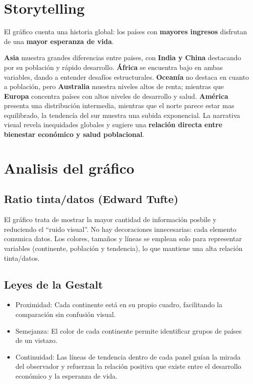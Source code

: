 \documentclass{../../miPlantilla}
\begin{document}
\maketitle

\section{Storytelling}
El gráfico cuenta una historia global: los países con \textbf{mayores ingresos} disfrutan de una \textbf{mayor esperanza de vida}.


\textbf{Asia} muestra grandes diferencias entre paises, con \textbf{India y China} destacando por su población y rápido desarrollo.
\textbf{África} se encuentra bajo en ambas variables, dando a entender desafíos estructurales. \textbf{Oceanía} no destaca en cuanto
a población, pero \textbf{Australia} muestra niveles altos de renta; mientras que \textbf{Europa} concentra países con altos
niveles de desarrollo y salud. \textbf{América} presenta una distribución intermedia, mientras que el norte parece estar mas equilibrado,
la tendencía del sur muestra una subida exponencial.
La narrativa visual revela inequidades globales y sugiere una \textbf{relación directa entre bienestar económico y salud poblacional}.

\newpage

\section{Analisis del gráfico}


\subsection{Ratio tinta/datos (Edward Tufte)}
El gráfico trata de mostrar la mayor cantidad de información posbile y reduciendo el “ruido visual”. No hay decoraciones
innecesarias: cada elemento comunica datos. Los colores, tamaños y líneas se emplean solo para representar variables (continente,
población y tendencia), lo que mantiene una alta relación tinta/datos.

\subsection{Leyes de la Gestalt}

\begin{itemize}
    \item Proximidad: Cada continente está en su propio cuadro, facilitando la comparación sin confusión visual.
    \item Semejanza: El color de cada continente permite identificar grupos de países de un vistazo.
    \item Continuidad: Las líneas de tendencia dentro de cada panel guían la mirada del observador y refuerzan la relación
            positiva que existe entre el desarrollo económico y la esperanza de vida.
\end{itemize}
\end{document}
